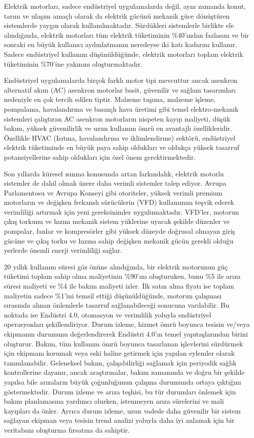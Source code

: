 Elektrik motorları, sadece endüstriyel uygulamalarda değil, aynı zamanda konut, tarım ve ulaşım amaçlı olarak da elektrik gücünü mekanik güce dönüştüren sistemlerde yaygın olarak kullanılmaktadır. Sürdükleri sistemlerle birlikte ele alındığında, elektrik motorları tüm elektrik tüketiminin \%40'ından fazlasını ve bir sonraki en büyük kullanıcı aydınlatmanın neredeyse iki katı kadarını kullanır. Sadece endüstriyel kullanım düşünüldüğünde, elektrik motorları toplam elektrik tüketiminin \%70'ine yakınını oluşturmaktadır.

Endüstriyel uygulamalarda birçok farklı motor tipi mevcuttur ancak asenkron alternatif akım (AC) asenkron motorlar basit, güvenilir ve sağlam tasarımları nedeniyle en çok tercih edilen tiptir. Malzeme taşıma, malzeme işleme, pompalama, havalandırma ve basınçlı hava üretimi gibi temel elektro-mekanik sistemleri çalıştıran AC asenkron motorların nispeten kayıp maliyeti, düşük bakım, yüksek güvenilirlik ve uzun kullanım ömrü en avantajlı özellikleridir. Özellikle HVAC (Isıtma, havalandırma ve iklimlendirme) sektörü, endüstriyel elektrik tüketiminde en büyük paya sahip oldukları ve oldukça yüksek tasarruf potansiyellerine sahip oldukları için özel önem gerektirmektedir.

Son yıllarda küresel ısınma konusunda artan farkındalık, elektrik motorlu sistemler de dahil olmak üzere daha verimli sistemler talep ediyor. Avrupa Parlamentosu ve Avrupa Konseyi gibi otoriteler, yüksek verimli premium motorların ve değişken frekanslı sürücülerin (VFD) kullanımını teşvik ederek verimliliği artırmak için yeni gereksinimler uygulumaktadır. VFD'ler, motorun çıkış torkunu ve hızını mekanik sistem yüklerine uyacak şekilde düzenler ve pompalar, fanlar ve kompresörler gibi yüksek düzeyde doğrusal olmayan giriş gücüne ve çıkış torku ve hızına sahip değişken mekanik gücün gerekli olduğu yerlerde önemli enerji verimliliği sağlar. 

20 yıllık kullanım süresi göz önüne alındığında, bir elektrik motorunun güç tüketimi toplam sahip olma maliyetinin \%90'ını oluşturuken, bunu \%5 ile arıza süresi maliyeti ve \%4 ile bakım maliyeti izler. İlk satın alma fiyatı ise toplam maliyetin sadece \%1'ini temsil ettiği düşünüldüğünde, motorun çalışması sırasında alınan önlemlerle tasarruf sağlanabileceği sonucuna varılabilir. Bu noktada ise Endüstri 4.0, otomasyon ve verimlilik yoluyla endüstriyel operasyonları şekillendiriyor. Durum izleme, hizmet ömrü boyunca tesisin ve/veya ekipmanın durumunu değerlendirerek Endüstri 4.0'ın temel yapıtaşlarından birini oluşturur. Bakım, tüm kullanım ömrü boyunca tasarlanan işlevlerini sürdürmek için ekipmanı korumak veya eski haline getirmek için yapılan eylemler olarak tanımlanabilir. Geleneksel bakım, çalışabilirliği sağlamak için periyodik sağlık kontrollerine dayanır, ancak araştırmalar, bakım zamanında ve doğru bir şekilde yapılsa bile arızaların büyük çoğunluğunun çalışma durumunda ortaya çıktığını göstermektedir. Durum izleme ve arıza teşhisi, bu tür durumları önlemek için bakım planlamasına yardımcı olurken, istenmeyen arıza sürelerini ve mali kayıpları da önler. Ayrıca durum izleme, uzun vadede daha güvenilir bir sistem sağlayan ekipman veya tesisin trend analizi yoluyla daha iyi anlamak için bir veritabanı oluşturma fırsatına da sahiptir.

